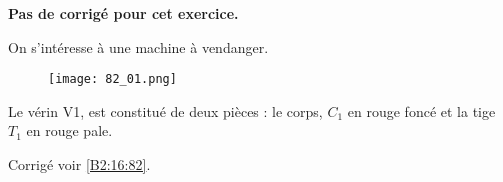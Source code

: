 \normaltrue \difficilefalse \tdifficilefalse
\correctionfalse

\setcounter{question}{0}


\ifcorrection
\else
\textbf{Pas de corrigé pour cet exercice.}
\fi

\ifprof
\else
On s'intéresse à une machine à vendanger.

\begin{figure}[H]
\centering
\texttt{[image: 82\_01.png]}
\end{figure} 

Le vérin V1, est constitué de deux pièces : le corps, $C_1$ en rouge foncé et la tige $T_1$ en rouge pale. 

\fi



 

\ifprof
\else


\begin{flushright}
\footnotesize{Corrigé  voir \ref{B2:16:82}.}
\end{flushright}%
\fi